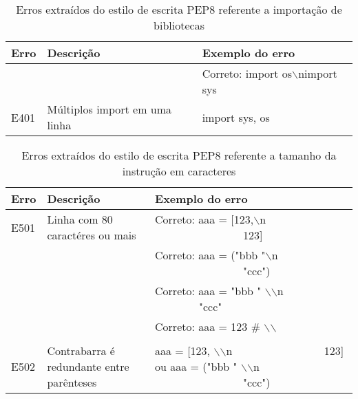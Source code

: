 	\begin{table}
		\scriptsize
		\begin{tabularx}{\linewidth}{ |l|X|X| }
			\hline
			\textbf{Erro}
			& \textbf{Descrição}
			& \textbf{Exemplo do erro} \\
			\hline
			
			& 
			& Correto: import os$\backslash$nimport sys \\ 
			\hline
			E401 
			& Múltiplos import em uma linha 
			& import sys, os \\ 
			\hline
		\end{tabularx}
		\caption{Erros extraídos do estilo de escrita PEP8 referente a importação de bibliotecas}
		\label{tab:pep8E400}
	\end{table}

	\begin{table}
		\scriptsize
		\begin{tabularx}{\linewidth}{ |l|X|X| }
			\hline
			\textbf{Erro}
			& \textbf{Descrição}
			& \textbf{Exemplo do erro} \\
			\hline
			E501 
			& Linha com 80 caractéres ou mais 
			& Correto: aaa = [123,$\backslash$n \ \ \ \ \ \ \ \  \ \ \ \ \ \ \ \ 123] \\
			\hline
			& 
			& Correto: aaa = ("bbb "$\backslash$n \ \ \ \ \ \ \ \  \ \ \ \ \ \ \ \ "ccc") \\
			\hline
			& 
			& Correto: aaa = "bbb " $\backslash$$\backslash$n \ \ \ \ \ \ \ \ "ccc" \\
			\hline
			& 
			& Correto: aaa = 123  \# $\backslash$$\backslash$ \\
			\hline
			& 
			&  \\
			\hline
			E502 
			& Contrabarra é redundante entre parênteses 
			& aaa = [123, $\backslash$$\backslash$n \ \ \ \ \ \ \ \  \ \ \ \ \ \ \ \ 123] ou aaa = ("bbb " $\backslash$$\backslash$n \ \ \ \ \ \ \ \  \ \ \ \ \ \ \ \ "ccc") \\
			\hline
		\end{tabularx}
		\caption{Erros extraídos do estilo de escrita PEP8 referente a tamanho da instrução em caracteres}
		\label{tab:pep8E500}
	\end{table}

